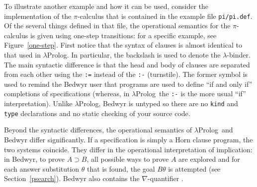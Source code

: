 \documentclass{article}
\newcommand{\lp}{$\lambda$Prolog}
\begin{document}
To illustrate another example and how it
can be used, consider the implementation of the $\pi$-calculus that is
contained in the example file \verb+pi/pi.def+.  Of the several
things defined in that file, the operational semantics for the
$\pi$-calculus is given using one-step transitions: for a specific
example, see Figure~\ref{one-step}.  First notice that the syntax of
clauses is almost identical to that used in $\lambda$Prolog.  In
particular, the backslash is used to denote the $\lambda$-binder.  The
main syntactic difference is that the head and body of clauses are
separated from each other using the \verb+:=+ instead of the
\verb+:-+ (turnstile).  The former symbol is used to remind
the Bedwyr user that programs are used to define ``if and only if''
completions of specifications (whereas, in \lp\ the \verb+:-+ is the
more usual ``if'' interpretation).  Unlike \lp, Bedwyr is
untyped so there are no {\tt kind} and {\tt type} declarations and no
static checking of your source code.

Beyond the syntactic differences, the operational semantics of \lp\
and Bedwyr differ significantly.  If a specification is simply a Horn
clause program, the two systems coincide. They differ in the operational
interpretation of implication: in Bedwyr, to prove $A\supset B$, all
possible ways to prove $A$ are explored and
for each answer substitution $\theta$ that is found, the goal
$B\theta$ is attempted (see Section~\ref{psearch}).  Bedwyr also
contains the $\nabla$-quantifier \cite{miller05tocl}.
\end{document}
